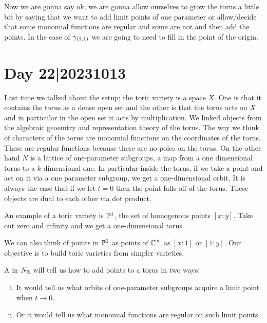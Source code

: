 \documentclass[12pt]{memoir}
\theoremstyle{definition}
\begin{document}
Now we are gonna say ok, we are gonna allow ourselves to grow the torus a little bit by saying that we want to add limit points of one parameter or allow/decide that some monomial functions are regular and some are not and then add the points. In the case of $\gamma_{(1,1)}$ we are going to need to fill in the point of the origin. 

\section{Day 22|20231013}

Last time we talked about the setup: the toric variety is a space $X$. One is that it contains the torus as a dense open set and the other is that the torus acts on $X$ and in particular in the open set it acts by multiplication. We linked objects from the algebraic geoemtry and representation theory of the torus. The way we think of characters of the torus are monomial functions on the coordinates of the torus. These are regular functions because there are no poles on the torus. On the other hand $N$ is a lattice of one-parameter subgroups, a map from a one dimensional torus to a $k$-dimensional one. In particular inside the torus, if we take a point and act on it via a one parameter subgroup, we get a one-dimensional orbit. It is always the case that if we let $t=0$ then the point falls off of the torus. These objects are dual to each other via dot product.

\begin{Ex}
    An example of a toric variety is $\mathbb{P}^1$, the set of homogenous points $[x:y]$. Take out zero and infinity and we get a one-dimensional torus.\par 
    We can also think of points in $\mathbb{P}^1$ as points of $\mathbb{C}^\times$ as $[x:1]$ or $[1:y]$. Our objective is to build toric varieties from simpler varieties.
\end{Ex}

\begin{Def}
    A  in $N_{\mathbb{R}}$ will tell us how to add points to a torus in two ways:
    \begin{enumerate}[i)]
        \item It would tell us what orbits of one-parameter subgroups acquire a limit point when $t\to 0$.
        \item Or it would tell us what monomial functions are regular on such limit points. 
    \end{enumerate}
\end{Def}
\end{document}

